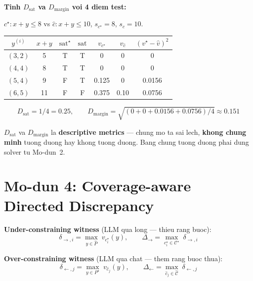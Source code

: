 \documentclass[11pt,a4paper]{article}
\begin{document}
\begin{example}
\textbf{Tinh $D_{\mathrm{sat}}$ va $D_{\mathrm{margin}}$ voi 4 diem test:}

$c^\star: x+y\leq8$ vs $\hat{c}: x+y\leq10$, \quad $s_{c^\star}=8$, $s_{\hat{c}}=10$.

\begin{center}
\small
\begin{tabular}{ccccccc}
\toprule
$y^{(i)}$ & $x+y$ & $\mathrm{sat}^\star$ & $\mathrm{sat}^{\hat{}}$
  & $v_{c^\star}$ & $v_{\hat{c}}$ & $(v^\star-\hat{v})^2$ \\
\midrule
$(3,2)$ & 5  & T & T & 0     & 0    & 0      \\
$(4,4)$ & 8  & T & T & 0     & 0    & 0      \\
$(5,4)$ & 9  & F & T & 0.125 & 0    & 0.0156 \\
$(6,5)$ & 11 & F & F & 0.375 & 0.10 & 0.0756 \\
\bottomrule
\end{tabular}
\end{center}

\[
D_{\mathrm{sat}} = 1/4 = 0.25, \qquad
D_{\mathrm{margin}} = \sqrt{(0+0+0.0156+0.0756)/4} \approx 0.151
\]
\end{example}

\begin{warningbox}
$D_{\mathrm{sat}}$ va $D_{\mathrm{margin}}$ la \textbf{descriptive metrics} ---
chung mo ta sai lech, \textbf{khong chung minh} tuong duong hay khong tuong duong.
Bang chung tuong duong phai dung solver tu Mo-dun~2.
\end{warningbox}

\section{Mo-dun 4: Coverage-aware Directed Discrepancy}

\begin{keyformula}
\textbf{Under-constraining witness} (LLM qua long --- thieu rang buoc):
\[
\delta_{\to,i} = \max_{y \in \widehat{P}}\; v_{c_i^\star}(y),
\qquad
\Delta_{\to} = \max_{c_i^\star \in \mathcal{C}^\star}\; \delta_{\to,i}
\]

\textbf{Over-constraining witness} (LLM qua chat --- them rang buoc thua):
\[
\delta_{\leftarrow,j} = \max_{y \in P^\star}\; v_{\hat{c}_j}(y),
\qquad
\Delta_{\leftarrow} = \max_{\hat{c}_j \in \widehat{\mathcal{C}}}\; \delta_{\leftarrow,j}
\]
\end{keyformula}
\end{document}
